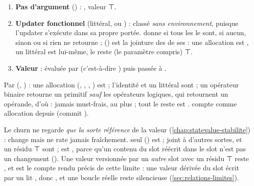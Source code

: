 \begin{enumerate}
  \item \textbf{Pas d'argument} () : , valeur ⊤.
  \item \textbf{Updater fonctionnel} (littéral, ou ) : classé \emph{sans environnement}, puisque l'updater s'exécute dans sa propre portée.  donne  si tous les  le sont,  si aucun,  sinon ou si rien ne retourne ;  () est la jointure des  de ses  : une allocation est , un littéral est lui-même, le reste (le paramètre compris) ⊤.
  \item \textbf{Valeur} : évaluée par  (c'est-à-dire ) puis passée à .
\end{enumerate}

Par  (, ) : une allocation (, , , ) est  ; l'identité  et un littéral sont  ; un opérateur binaire retourne un primitif \emph{sauf} les opérateurs logiques, qui retournent un opérande, d'où  : \og jamais must-frais, au plus \fg{} ; tout le reste est .  compte comme allocation depuis  (commit \snapshotCommit).


Le churn ne regarde \emph{que la sorte référence} de la valeur (\cref{chap:statevalue-stabilite}) :  change mais ne rate jamais  \og fraîchement\fg{}.  seul () est  ;  joint à d'autres sortes,  et un résidu ⊤ sont  ;  est , parce qu'un contenu du slot réécrit dans le slot n'est pas un changement (). Une valeur versionnée par un \emph{autre} slot avec un résidu ⊤ reste , et  est \og le compte rendu précis\fg{} de cette limite : une valeur dérivée du slot écrit par un  lit , donc , et une boucle réelle reste silencieuse (\cref{sec:relations-limites}).

